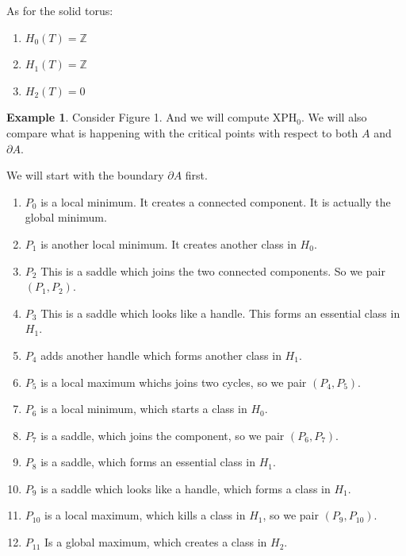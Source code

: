\documentclass[a4paper]{article}
\theoremstyle{theorem}
\theoremstyle{definition}
\newtheorem{example}{Example}
\theoremstyle{remark}
\theoremstyle{gremark}
\theoremstyle{discussion}
\theoremstyle{notation}
\begin{document}
As for the solid torus:

\begin{enumerate}
	\item $H_0(T)=\mathbb{Z}$
	\item $H_1(T)=\mathbb{Z}$
	\item $H_2(T)=0$
\end{enumerate}



\begin{example}
	Consider Figure 1. And we will compute $\mathrm{XPH}_0$. We will also compare what is happening with the critical points with respect to both $A$ and $\partial A$.
	
	\noindent

			We will start with the boundary $\partial A$ first. 
			

			
			
		\begin{enumerate}
			\item $P_0$ is a local minimum. It creates a connected component. It is actually the global minimum.
			\item $P_1$ is another local minimum. It creates another class in $H_0$.
			\item $P_2$ This is a saddle which joins the two connected components. So we pair $(P_1,P_2)$.
			\item $P_3$ This is a saddle which looks like a handle. This forms an essential class in $H_1$.
			\item $P_4$ adds another handle which forms another class in $H_1$.
			\item $P_5$ is a local maximum whichs joins two cycles, so we pair $(P_4,P_5)$.
			\item $P_6$ is a local minimum, which starts a class in $H_0$.
			\item $P_7$ is a saddle, which joins the component, so we pair $(P_6,P_7)$.
			\item $P_8$ is a saddle, which forms an essential class in $H_1$.
			\item $P_9$ is a saddle which looks like a handle, which forms a class in $H_1$.
			\item $P_{10}$ is a local maximum, which kills a class in $H_1$, so we pair $(P_9,P_{10})$.
			\item $P_{11}$ Is a global maximum, which creates a class in $H_2$.
		\end{enumerate}


	


\end{example}
\end{document}
